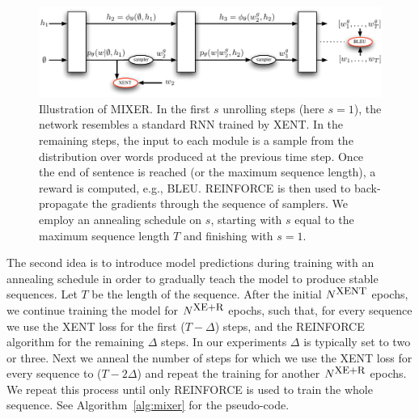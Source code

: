 \begin{figure}[!t]
\begin{center}
 \includegraphics[width=0.75\linewidth]{mixer.pdf}
\end{center}
\caption{Illustration of MIXER. In the first $s$ unrolling steps (here $s=1$),
  the network resembles a standard RNN trained by XENT. In the
  remaining steps, the input to each module is a sample from the
  distribution over words produced at the previous time step. Once the
  end of sentence is reached (or the maximum sequence length), a
  reward is computed, e.g., BLEU. REINFORCE is then
  used to back-propagate the gradients through the sequence of
  samplers. We employ an annealing schedule on $s$, starting with 
  $s$ equal to the maximum sequence length $T$ and finishing with $s = 1$.
 }
\label{fig:mixer}
\end{figure}

The second idea is to introduce model predictions during training 
with an annealing schedule in order to gradually teach the model to produce stable sequences. 
Let $T$ be the length of the sequence.
After the initial $N^{\mbox{\small{XENT}}}$ epochs, we continue training the 
model for $N^{\mbox{\small{XE+R}}}$ epochs, such that, for every sequence 
we use the XENT loss for the first ($T - \Delta$) steps, and the REINFORCE algorithm 
for the remaining $\Delta$ steps.
In our experiments $\Delta$ is typically set to two or three. 
Next we anneal the number of steps for which we use the XENT loss for every sequence to  
($T - 2 \Delta$) and repeat the training for another $N^{\mbox{\small{XE+R}}}$ epochs. 
We repeat this process until only REINFORCE is used to train the whole sequence.
See Algorithm~\ref{alg:mixer} for the pseudo-code. 


